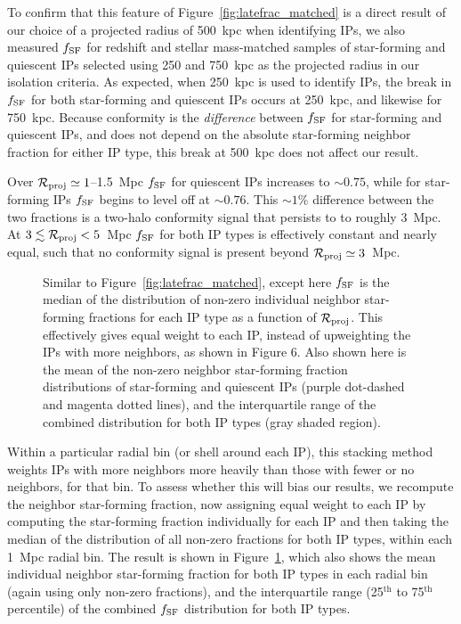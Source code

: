 To confirm that this feature of Figure~\ref{fig:latefrac_matched} is a direct result of our choice of a projected radius of 500~kpc when identifying IPs, we also measured $\flate$ for redshift and stellar mass-matched samples of star-forming and quiescent IPs selected using 250 and 750~kpc as the projected radius in our isolation criteria.  As expected, when 250~kpc is used to identify IPs, the break in $\flate$ for both star-forming and quiescent IPs occurs at 250~kpc, and likewise for 750~kpc.
Because conformity is the \emph{difference} between $\flate$ for star-forming and quiescent IPs, and does not depend on the absolute star-forming neighbor fraction for either IP type, this break at 500~kpc does not affect our result.

Over $\mathcal{R}_{\text{proj}}\simeq1$--1.5~Mpc $\flate$ for quiescent IPs increases to $\sim0.75$, while for star-forming IPs $\flate$ begins to level off at $\sim0.76$.  This $\sim1$\% difference between the two fractions is a two-halo conformity signal that persists to to roughly 3~Mpc.  At $3\lesssim\mathcal{R}_{\text{proj}}<5$~Mpc $\flate$ for both IP types is effectively constant and nearly equal, such that no conformity signal is present beyond $\mathcal{R}_{\text{proj}}\simeq3$~Mpc.


\begin{figure}
  \epstrim{0.5in 0.1in 0.3in 0.3in}
  \caption{
Similar to Figure~\ref{fig:latefrac_matched}, except here $\flate$ is the median of 
the distribution of non-zero individual neighbor star-forming fractions for each IP type as a function of $\mathcal{R}_{\text{proj}}$.  This effectively gives equal weight to each IP, instead of upweighting the IPs with more neighbors, as shown in Figure 6.
Also shown here is the mean of the non-zero neighbor star-forming fraction distributions of star-forming and quiescent IPs (purple dot-dashed and magenta dotted lines),
and the interquartile range of the combined distribution for both IP types (gray shaded region).
}
  \label{fig:latefrac_quartiles}
\end{figure}

Within a particular radial bin (or shell around each IP), this stacking method 
weights IPs with more neighbors more heavily than those with fewer or no neighbors,
for that bin.
To assess whether this will bias our results, we recompute the neighbor star-forming fraction, 
now assigning equal weight to each IP by computing the star-forming fraction 
individually for each IP and then taking the median of the distribution of all 
non-zero fractions for both IP types, within each 1~Mpc radial bin.
The result is shown in Figure~\ref{fig:latefrac_quartiles}, which also shows the 
mean individual neighbor star-forming fraction for both IP types in each radial bin (again using
only non-zero fractions), and the interquartile range (25$^{\textrm{th}}$ to 75$^{\textrm{th}}$ percentile) of the combined $\flate$ distribution for both IP types.

